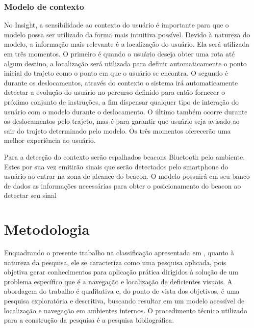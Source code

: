 \documentclass[english,brazilian]{UNISINOSmonografia}
\begin{document}
\subsection{Modelo de contexto}
No Insight, a sensibilidade ao contexto do usuário é importante para que o modelo possa ser utilizado da forma mais intuitiva possível. Devido à natureza do modelo, a informação mais relevante é a localização do usuário. Ela será utilizada em três momentos. O primeiro é quando o usuário deseja obter uma rota até algum destino, a localização será utilizada para definir automaticamente o ponto inicial do trajeto como o ponto em que o usuário se encontra. O segundo é durante os deslocamentos, através do contexto o sistema irá automaticamente detectar a evolução do usuário no percurso definido para então fornecer o próximo conjunto de instruções, a fim dispensar qualquer tipo de interação do usuário com o modelo durante o deslocamento. O último também ocorre durante os deslocamentos pelo trajeto, mas é para garantir que usuário seja avisado ao sair do trajeto determinado pelo modelo. Os três momentos oferecerão uma melhor experiência ao usuário.

Para a detecção do contexto serão espalhados beacons Bluetooth pelo ambiente. Estes por sua vez emitirão sinais que serão detectados pelo smartphone do usuário ao entrar na zona de alcance do beacon. O modelo possuirá em seu banco de dados as informações necessárias para obter o posicionamento do beacon ao detectar seu sinal

\chapter{Metodologia}

Enquadrando o presente trabalho na classificação apresentada em , quanto à natureza da pesquisa, ele se caracteriza como uma pesquisa aplicada, pois objetiva gerar conhecimentos para aplicação prática dirigidos à solução de um problema específico que é a navegação e localização de deficientes visuais. A abordagem do trabalho é qualitativa e, do ponto de vista dos objetivos, é uma pesquisa exploratória e descritiva, buscando resultar em um modelo acessível de localização e navegação em ambientes internos. O procedimento técnico utilizado para a construção da pesquisa é a pesquisa bibliográfica.
\end{document}
